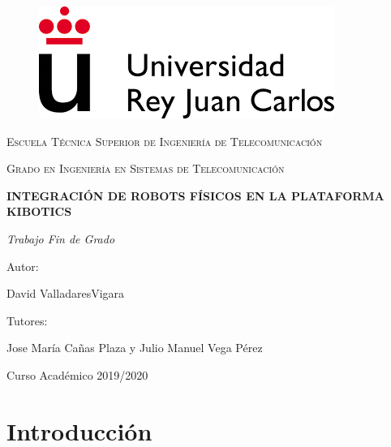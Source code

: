 \documentclass{report}
\begin{document}
\begin{titlepage}
\centering

\begin{figure}[t]
\includegraphics[scale=0.5]{images/urjc_logo.png}
\centering
\vspace{0.5cm} %
\end{figure}

{\scshape\Large Escuela Técnica Superior de Ingeniería de Telecomunicación \par}
\vspace{1cm}
{\scshape\Large Grado en Ingeniería en Sistemas de Telecomunicación \par}
\vspace{3cm}
{\bfseries\LARGE INTEGRACIÓN DE ROBOTS FÍSICOS EN LA PLATAFORMA KIBOTICS \par}
\vspace{3cm}
{\itshape\Large Trabajo Fin de Grado \par}
\vfill
{\Large Autor: }
{\Large David ValladaresVigara \par}
{\Large Tutores: }
{\Large Jose María Cañas Plaza y Julio Manuel Vega Pérez \par}
\vfill
{\Large Curso Académico 2019/2020 \par}
\end{titlepage} 

\renewcommand{\abstractname}{\Large Resumen}
\begin{abstract}



\end{abstract}

\setcounter{tocdepth}{3} %
\renewcommand{\contentsname}{Índice general}
\tableofcontents
\clearpage

\renewcommand{\listfigurename}{Índice de figuras}
\listoffigures

\renewcommand{\listtablename}{Índice de tablas}
\listoftables

\renewcommand{\chaptername}{Capítulo}
\chapter{Introducción}
\end{document}
